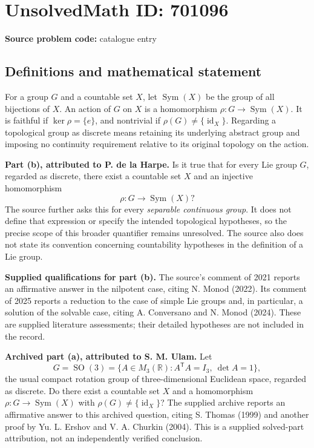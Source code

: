 \documentclass[11pt]{article}
\newcommand{\R}{\mathbb{R}}
\begin{document}
\section*{UnsolvedMath ID: 701096}
\textbf{Source problem code:} catalogue entry
\subsection{Definitions and mathematical statement}
For a group \(G\) and a countable set \(X\), let \(\operatorname{Sym}(X)\) be the group of all bijections of \(X\). An action of \(G\) on \(X\) is a homomorphism \(\rho:G\to\operatorname{Sym}(X)\). It is faithful if \(\ker\rho=\{e\}\), and nontrivial if \(\rho(G)\ne\{\operatorname{id}_X\}\). Regarding a topological group as discrete means retaining its underlying abstract group and imposing no continuity requirement relative to its original topology on the action.

\textbf{Part (b), attributed to P. de la Harpe.} Is it true that for every Lie group \(G\), regarded as discrete, there exist a countable set \(X\) and an injective homomorphism
\[
\rho:G\longrightarrow\operatorname{Sym}(X)?
\]
The source further asks this for every \emph{separable continuous group}. It does not define that expression or specify the intended topological hypotheses, so the precise scope of this broader quantifier remains unresolved. The source also does not state its convention concerning countability hypotheses in the definition of a Lie group.

\textbf{Supplied qualifications for part (b).} The source's comment of 2021 reports an affirmative answer in the nilpotent case, citing N. Monod (2022). Its comment of 2025 reports a reduction to the case of simple Lie groups and, in particular, a solution of the solvable case, citing A. Conversano and N. Monod (2024). These are supplied literature assessments; their detailed hypotheses are not included in the record.

\textbf{Archived part (a), attributed to S. M. Ulam.} Let
\[
G=\operatorname{SO}(3)=\{A\in M_3(\R):A^{\mathsf T}A=I_3,\ \det A=1\},
\]
the usual compact rotation group of three-dimensional Euclidean space, regarded as discrete. Do there exist a countable set \(X\) and a homomorphism \(\rho:G\to\operatorname{Sym}(X)\) with \(\rho(G)\ne\{\operatorname{id}_X\}\)? The supplied archive reports an affirmative answer to this archived question, citing S. Thomas (1999) and another proof by Yu. L. Ershov and V. A. Churkin (2004). This is a supplied solved-part attribution, not an independently verified conclusion.
\end{document}

